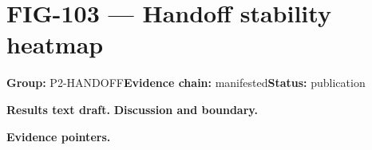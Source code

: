 \clearpage
\section{FIG-103 --- Handoff stability heatmap}
\label{figpage:fig-103}
\textbf{Group:} P2-HANDOFF\quad \textbf{Evidence chain:} manifested\quad \textbf{Status:} publication

\textbf{Results text draft.} 
\textbf{Discussion and boundary.} 


\textbf{Evidence pointers.}



\vfill
